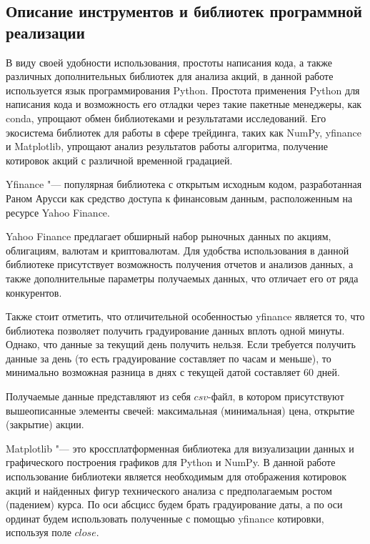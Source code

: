\documentclass[bachelor, och, coursework]{SCWorks}
\begin{document}
    \subsection{Описание инструментов и библиотек программной реализации}

        В виду своей удобности использования, простоты написания кода, а также
        различных дополнительных библиотек для анализа акций, в данной работе 
        используется язык программирования Python. Простота применения Python для 
        написания кода и возможность его отладки через такие пакетные менеджеры, 
        как conda, упрощают обмен библиотеками и результатами исследований. 
        Его экосистема библиотек для работы в сфере трейдинга, таких как NumPy, 
        yfinance и Matplotlib, упрощают анализ результатов работы алгоритма, получение 
        котировок акций с различной временной градацией.

        Yfinance "--- популярная библиотека с открытым исходным кодом, разработанная 
        Раном Арусси как средство доступа к финансовым данным, расположенным на
        ресурсе Yahoo Finance.

        Yahoo Finance предлагает обширный набор рыночных данных по акциям, 
        облигациям, валютам и криптовалютам. Для удобства использования в данной
        библиотеке присутствует возможность получения отчетов и анализов данных, 
        а также дополнительные параметры получаемых данных, что отличает его от 
        ряда конкурентов.

        Также стоит отметить, что отличительной особенностью yfinance является то, 
        что библиотека позволяет получить градуирование данных вплоть одной минуты. 
        Однако, что данные за текущий день получить нельзя. Если требуется 
        получить данные за день (то есть градуирование составляет по часам и меньше),
        то минимально возможная разница в днях с текущей датой составляет 60 дней.

        Получаемые данные представляют из себя $csv$-файл, в котором присутствуют
        вышеописанные элементы свечей: максимальная (минимальная) цена, открытие
        (закрытие) акции.

        
        Matplotlib "--- это кроссплатформенная библиотека для визуализации данных 
        и графического построения графиков для Python и NumPy. В данной работе
        использование библиотеки является необходимым для отображения котировок
        акций и найденных фигур технического анализа с предполагаемым ростом (падением)
        курса. По оси абсцисс будем брать градуирование даты, а по оси ординат
        будем использовать полученные с помощью yfinance котировки, используя
        поле $close$.
\end{document}
